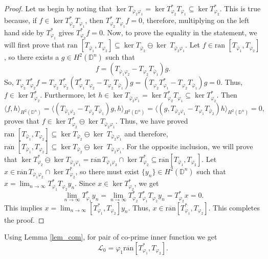 \documentclass[12pt, a4 paper]{amsart}
\newcommand{\cll}{\mathcal{L}}
\newcommand{\D}{\mathbb{D}}
\theoremstyle{definition}
\theoremstyle{plain}
\theoremstyle{definition}
\numberwithin{equation}{section}
\let\phi=\varphi
\begin{document}
\begin{proof}
Let us begin by noting that $\ker T_{\bar \phi_2 \phi_1} = \ker T_{\phi_2}^* T_{\phi_1} \subseteq \ker T_{\phi_2}^*$. This is true because, if $f \in \ker T_{\phi_2}^* T_{\phi_1} $, then $T_{\phi_2}^* T_{\phi_1}  f = 0$, therefore, multiplying on the left hand side by $T_{\phi_1}^*$ gives $T_{\phi_2}^* f = 0$. Now, to prove the equality in the statement, we will first prove that $\mbox{ran } [T_{\bar \phi_1}, T_{\phi_2}] \subseteq \ker T_{\bar \phi_2} \ominus \ker~T_{\bar \phi_2 \phi_1}$.  Let $f \in \mbox{ran } [T_{\bar \phi_1}, T_{\phi_2}]$, so there exists a $g \in H^2(\D^n)$ such that
\[
f = (T_{\bar \phi_1 \phi_2} - T_{\phi_2} T_{\bar \phi_1})g.
\]
So, $T_{\phi_2}T_{\phi_2}^* f = T_{\phi_2}T_{\phi_2}^* (T_{\phi_1}^* T_{\phi_2} - T_{\phi_2} T_{\bar \phi_1})g = (T_{\phi_2} T_{\phi_1}^*  - T_{\phi_2} T_{\bar \phi_1})g = 0$. Thus, $f \in \ker T_{\phi_2}^*$. Furthermore, let $h \in \ker T_{\bar \phi_2 \phi_1}  = \ker T_{\phi_2}^* T_{\phi_1} \subseteq \ker T_{\phi_2}^*$. Then
\[
\langle f , h \rangle_{H^2(\D^n)} = \langle (T_{\bar \phi_1 \phi_2} - T_{\phi_2} T_{\bar \phi_1})g, h \rangle_{H^2(\D^n)} = \langle (g, T_{\bar \phi_2 \phi_1} - T_{\phi_1} T_{\bar \phi_2}) h \rangle_{H^2(\D^n)} =0,
\]
proves that $f \in \ker T_{\phi_2}^* \ominus \ker T_{\bar \phi_2 \phi_1}$. Thus, we have proved $\mbox{ran } [T_{\bar \phi_1}, T_{\phi_2}] \subseteq \ker T_{\bar \phi_2} \ominus \ker~T_{\bar \phi_2 \phi_1}$ and therefore, $\overline{\mbox{ran }} [T_{\bar \phi_1}, T_{\phi_2}] \subseteq \ker T_{\bar \phi_2} \ominus \ker~T_{\bar \phi_2 \phi_1}$. For the opposite inclusion, we will prove that $\ker T_{\phi_2}^* \ominus \ker T_{\bar \phi_2 \phi_1} = \overline{\mbox{ran}} \, T_{\bar \phi_1 \phi_2} \cap \ker T_{\phi_2}^* \subseteq \overline{\mbox{ran}} [T_{\bar \phi_1}, T_{\phi_2}]$. Let $x \in \overline{\mbox{ran}} \, T_{\bar \phi_1 \phi_2} \cap \ker T_{\phi_2}^*$, so there must exist $\{y_n\} \in H^2(\D^n)$ such that $x = \lim_{n \rightarrow \infty}T_{\phi_1}^* T_{\phi_2} y_n$. Since $x \in \ker T_{\phi_2}^*$, we get
\[
\lim_{n \rightarrow \infty} T_{\phi_1}^* y_n = \lim_{n \rightarrow \infty} T_{\phi_2}^* T_{\phi_1}^* T_{\phi_2} y_n =  T_{\phi_2}^* x  = 0.
\]
This implies $x = \lim_{n \rightarrow \infty} [T_{\phi_1}^*, T_{\phi_2}]y_n$. Thus, $x \in \overline{\mbox{ran}} [T_{\phi_1}^*, T_{\phi_2}]$. This completes the proof.
\end{proof}
Using Lemma \ref{lem_com}, for pair of co-prime inner function we get
\begin{equation}\label{L_n}
\cll_0 = \phi_1 \overline{\mbox{ran}} [T_{\phi_1}^*, T_{\phi_2}].
\end{equation}
\end{document}
